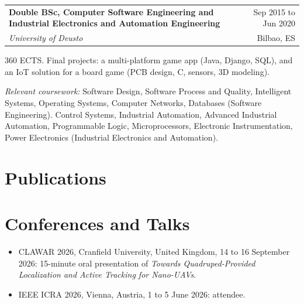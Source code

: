 \documentclass[a4paper,11pt]{article}
\makeatletter
\newcommand{\entry}[4]{%
    \noindent\begin{tabularx}{\linewidth}{@{}>{\raggedright\arraybackslash}X r@{}}
        \textbf{#1} & #2\\
        \textit{#3} & #4
    \end{tabularx}\par}
\makeatother
\begin{document}
\entry{Double BSc, Computer Software Engineering and Industrial Electronics and Automation Engineering}{Sep 2015 to Jun 2020}{University of Deusto}{Bilbao, ES}
360 ECTS. Final projects: a multi-platform game app (Java, Django, SQL), and an IoT solution for a board game (PCB design, C, sensors, 3D modeling).\\
{\raggedright\textit{Relevant coursework:} Software Design, Software Process and Quality, Intelligent Systems, Operating Systems, Computer Networks, Databases (Software Engineering). Control Systems, Industrial Automation, Advanced Industrial Automation, Programmable Logic, Microprocessors, Electronic Instrumentation, Power Electronics (Industrial Electronics and Automation).\par}

\section{Publications}


\section{Conferences and Talks}
\begin{itemize}
    \item CLAWAR 2026, Cranfield University, United Kingdom, 14 to 16 September 2026: 15-minute oral presentation of \textit{Towards Quadruped-Provided Localization and Active Tracking for Nano-UAVs}.
    \item IEEE ICRA 2026, Vienna, Austria, 1 to 5 June 2026: attendee.
\end{itemize}

\end{document}
